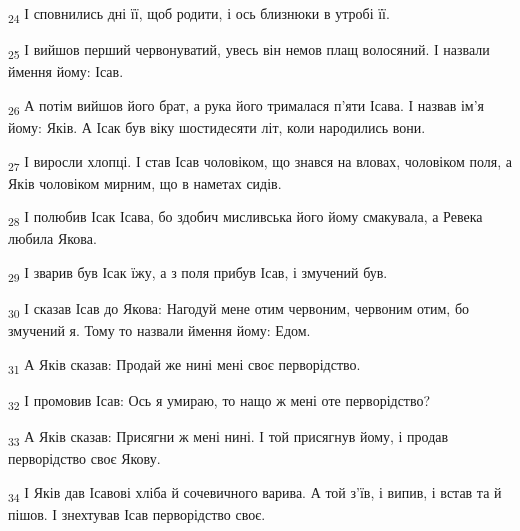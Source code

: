 \begin{tcolorbox}
\textsubscript{24} І сповнились дні її, щоб родити, і ось близнюки в утробі її.
\end{tcolorbox}
\begin{tcolorbox}
\textsubscript{25} І вийшов перший червонуватий, увесь він немов плащ волосяний. І назвали ймення йому: Ісав.
\end{tcolorbox}
\begin{tcolorbox}
\textsubscript{26} А потім вийшов його брат, а рука його трималася п'яти Ісава. І назвав ім'я йому: Яків. А Ісак був віку шостидесяти літ, коли народились вони.
\end{tcolorbox}
\begin{tcolorbox}
\textsubscript{27} І виросли хлопці. І став Ісав чоловіком, що знався на вловах, чоловіком поля, а Яків чоловіком мирним, що в наметах сидів.
\end{tcolorbox}
\begin{tcolorbox}
\textsubscript{28} І полюбив Ісак Ісава, бо здобич мисливська його йому смакувала, а Ревека любила Якова.
\end{tcolorbox}
\begin{tcolorbox}
\textsubscript{29} І зварив був Ісак їжу, а з поля прибув Ісав, і змучений був.
\end{tcolorbox}
\begin{tcolorbox}
\textsubscript{30} І сказав Ісав до Якова: Нагодуй мене отим червоним, червоним отим, бо змучений я. Тому то назвали ймення йому: Едом.
\end{tcolorbox}
\begin{tcolorbox}
\textsubscript{31} А Яків сказав: Продай же нині мені своє перворідство.
\end{tcolorbox}
\begin{tcolorbox}
\textsubscript{32} І промовив Ісав: Ось я умираю, то нащо ж мені оте перворідство?
\end{tcolorbox}
\begin{tcolorbox}
\textsubscript{33} А Яків сказав: Присягни ж мені нині. І той присягнув йому, і продав перворідство своє Якову.
\end{tcolorbox}
\begin{tcolorbox}
\textsubscript{34} І Яків дав Ісавові хліба й сочевичного варива. А той з'їв, і випив, і встав та й пішов. І знехтував Ісав перворідство своє.
\end{tcolorbox}
